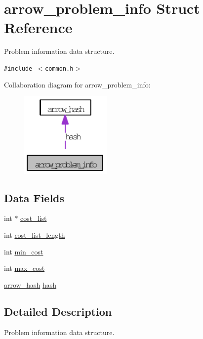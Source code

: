 \hypertarget{structarrow__problem__info}{
\section{arrow\_\-problem\_\-info Struct Reference}
\label{structarrow__problem__info}
}
Problem information data structure.  


{\tt \#include $<$common.h$>$}

Collaboration diagram for arrow\_\-problem\_\-info:\nopagebreak
\begin{figure}[H]
\begin{center}
\leavevmode
\includegraphics[width=126pt]{structarrow__problem__info__coll__graph}
\end{center}
\end{figure}
\subsection*{Data Fields}
\begin{CompactItemize}
\item 
int $\ast$ \hyperlink{structarrow__problem__info_7c9472312d7057fb9d74eb5579930216}{cost\_\-list}
\item 
int \hyperlink{structarrow__problem__info_54bbdc187af19361072480b45016f171}{cost\_\-list\_\-length}
\item 
int \hyperlink{structarrow__problem__info_46fabcc0ccd3a732cebb014331d4eeb5}{min\_\-cost}
\item 
int \hyperlink{structarrow__problem__info_724060f3be25521cca761899913c2776}{max\_\-cost}
\item 
\hyperlink{structarrow__hash}{arrow\_\-hash} \hyperlink{structarrow__problem__info_d62672139bdce70b23d8c72ecd96ff0d}{hash}
\end{CompactItemize}


\subsection{Detailed Description}
Problem information data structure. 

